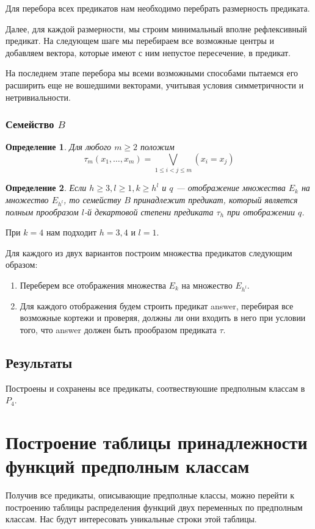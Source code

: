 \documentclass[a4paper,14pt]{extreport}
\newtheorem{opr}{Определение}
\begin{document}
Для перебора всех предикатов нам необходимо перебрать размерность предиката.

Далее, для каждой размерности, мы строим минимальный вполне рефлексивный предикат.
На следующем шаге мы перебираем все возможные центры и добавляем вектора, которые имеют с ним непустое пересечение, в предикат.

На последнем этапе перебора мы  всеми возможными способами пытаемся его расширить еще не вошедшими векторами, учитывая условия симметричности и нетривиальности.

\subsection{Семейство $B$}
\begin{opr}
Для любого $m \geqslant 2$ положим
$$ \tau_m(x_1, \ldots, x_m) = \bigvee_{1\leqslant i < j \leqslant m}(x_i=x_j) $$
\end{opr}
\begin{opr}
Если $h \geqslant 3, l \geqslant 1, k \geqslant h^l$ и $q$ — отображение множества $E_k$ на  множество $E_{h^l}$, то семейству $B$ принадлежит предикат, который является полным прообразом $l$-й декартовой степени предиката $\tau_h$ при отображении $q$.
\end{opr}
При $k=4$ нам подходит $h=3,4$ и $l=1$.

Для каждого из двух вариантов построим множества предикатов следующим образом:
\begin{enumerate}
\item Переберем все отображения множества $E_k$ на  множество $E_{h^l}$.
\item Для каждого отображения будем строить предикат answer, перебирая все возможные кортежи и проверяя, должны ли они входить в него при условии того, что answer должен быть прообразом предиката $\tau$.
\end{enumerate} 

\section{Результаты}
Построены и сохранены все предикаты, соотвествуюшие предполным классам в $P_4$.  


\newpage
\chapter{Построение таблицы принадлежности функций предполным классам}
Получив все предикаты, описывающие предполные классы, можно перейти к построению таблицы распределения функций двух переменных по предполным классам. Нас будут интересовать уникальные строки этой таблицы. 
\end{document}
